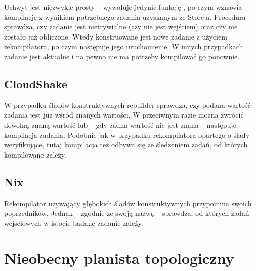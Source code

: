 

Uchwyt  jest niezwykle prosty -- wywołuje jedynie funkcję , po czym wznawia kompilację z wynikiem potrzebnego zadania uzyskanym ze Store'a. Procedura  sprawdza, czy zadanie jest nietrywialne (czy nie jest wejściem) oraz czy nie zostało już obliczone. Wtedy konstruowane jest nowe zadanie z użyciem rekompilatora, po czym następuje jego uruchomienie. W innych przypadkach zadanie jest aktualne i na pewno nie ma potrzeby kompilować go ponownie.

\subsection{CloudShake}





W przypadku śladów konstruktywnych rebuilder sprawdza, czy podana wartość zadania jest już wśród znanych wartości. W przeciwnym razie można zwrócić dowolną znaną wartość lub -- gdy żadna wartość nie jest znana -- następuje kompilacja zadania. Podobnie jak w przypadku rekompilatora opartego o ślady weryfikujące, tutaj kompilacja też odbywa się ze śledzeniem zadań, od których kompilowane zależy.


\subsection{Nix}



Rekompilator używający głębokich śladów konstruktywnych przypomina swoich poprzedników. Jednak -- zgodnie ze swoją nazwą -- sprawdza, od których zadań wejściowych w istocie badane zadanie zależy.




\section{Nieobecny planista topologiczny}

